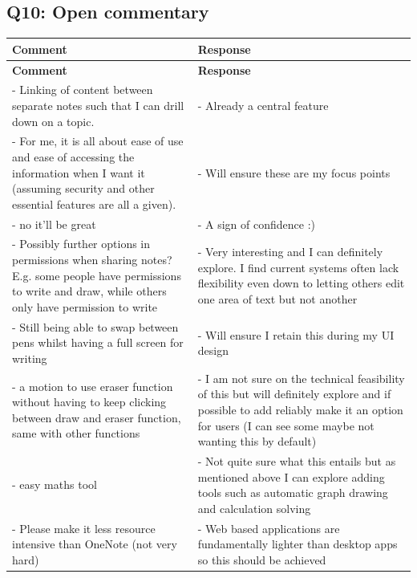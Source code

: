 \subsection*{Q10: Open commentary}

\begin{longtable}{@{}p{}@{\hspace{1em}}p{}@{}}
\toprule
\textbf{Comment} & \textbf{Response} \\
\midrule
\endfirsthead

\toprule
\textbf{Comment} & \textbf{Response} \\
\midrule
\endhead


- Linking of content between separate notes such that I can drill down on a topic. &
- Already a central feature \\

- For me, it is all about ease of use and ease of accessing the information when I want it (assuming security and other essential features are all a given).  &
- Will ensure these are my focus points \\

- no it'll be great &
- A sign of confidence :) \\

- Possibly further options in permissions when sharing notes? E.g. some people have permissions to write and draw, while others only have permission to write &
- Very interesting and I can definitely explore. I find current systems often lack flexibility even down to letting others edit one area of text but not another \\

- Still being able to swap between pens whilst having a full screen for writing &
- Will ensure I retain this during my UI design \\

 - a motion to use eraser function without having to keep clicking between draw and eraser function, same with other functions &
 - I am not sure on the technical feasibility of this but will definitely explore and if possible to add reliably make it an option for users (I can see some maybe not wanting this by default) \\

 - easy maths tool & 
 - Not quite sure what this entails but as mentioned above I can explore adding tools such as automatic graph drawing and calculation solving \\

 - Please make it less resource intensive than OneNote (not very hard) &
 - Web based applications are fundamentally lighter than desktop apps so this should be achieved \\


\end{longtable}
